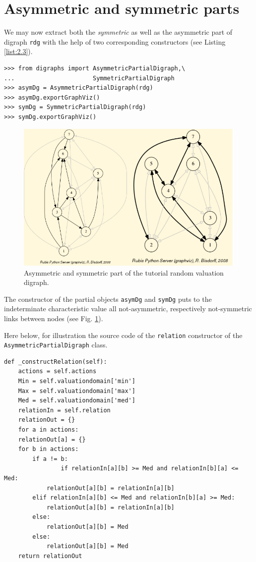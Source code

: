 \section{Asymmetric and symmetric parts}
\label{sec:2.3}

We may now extract both the \emph{}\emph{symmetric} as well as the asymmetric part of digraph \texttt{rdg} with the help of two corresponding constructors (see Listing \ref{list:2.3}).
\begin{lstlisting}[caption={Computing asymmetric and symmetric Parts},label=list:2.3]
>>> from digraphs import AsymmetricPartialDigraph,\
...                      SymmetricPartialDigraph
>>> asymDg = AsymmetricPartialDigraph(rdg)
>>> asymDg.exportGraphViz()
>>> symDg = SymmetricPartialDigraph(rdg)
>>> symDg.exportGraphViz()
\end{lstlisting}
\begin{figure}[h]
\includegraphics[width=12cm]{Figures/asymSymParts.png}
\caption{Asymmetric and symmetric part of the tutorial random valuation digraph.}
\label{fig:2.2}       %
\end{figure}
The constructor of the partial objects \texttt{asymDg} and \texttt{symDg} puts to the indeterminate characteristic value all not-asymmetric, respectively not-symmetric links between nodes (see Fig. \ref{fig:2.2}).

Here below, for illustration the source code of the {\tt relation} constructor of the {\tt AsymmetricPartialDigraph} class.
\begin{lstlisting}[caption={Computing the asymmetric part of a bipolar-valued relation},label=list:2.4,basicstyle=\ttfamily\scriptsize]
def _constructRelation(self):
    actions = self.actions
    Min = self.valuationdomain['min']
    Max = self.valuationdomain['max']
    Med = self.valuationdomain['med']
    relationIn = self.relation
    relationOut = {}
    for a in actions:
	relationOut[a] = {}
	for b in actions:
	    if a != b:
                if relationIn[a][b] >= Med and relationIn[b][a] <= Med:
		    relationOut[a][b] = relationIn[a][b]
		elif relationIn[a][b] <= Med and relationIn[b][a] >= Med:
		    relationOut[a][b] = relationIn[a][b]
		else:
		    relationOut[a][b] = Med
		else:
		    relationOut[a][b] = Med
    return relationOut
\end{lstlisting}

